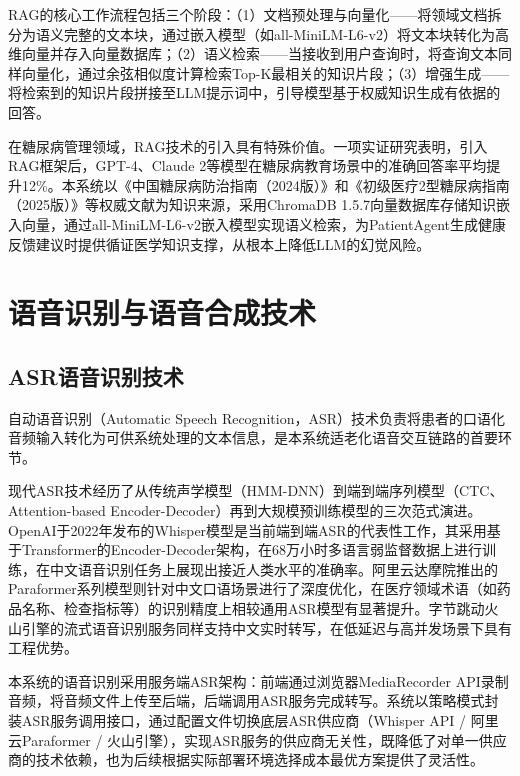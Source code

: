RAG的核心工作流程包括三个阶段：（1）文档预处理与向量化——将领域文档拆分为语义完整的文本块，通过嵌入模型（如all-MiniLM-L6-v2）将文本块转化为高维向量并存入向量数据库；（2）语义检索——当接收到用户查询时，将查询文本同样向量化，通过余弦相似度计算检索Top-K最相关的知识片段；（3）增强生成——将检索到的知识片段拼接至LLM提示词中，引导模型基于权威知识生成有依据的回答\todocite{}。

在糖尿病管理领域，RAG技术的引入具有特殊价值。一项实证研究表明，引入RAG框架后，GPT-4、Claude 2等模型在糖尿病教育场景中的准确回答率平均提升12\%\todocite{}。本系统以《中国糖尿病防治指南（2024版）》和《初级医疗2型糖尿病指南（2025版）》等权威文献为知识来源，采用ChromaDB 1.5.7向量数据库存储知识嵌入向量，通过all-MiniLM-L6-v2嵌入模型实现语义检索，为PatientAgent生成健康反馈建议时提供循证医学知识支撑，从根本上降低LLM的幻觉风险。

\section{语音识别与语音合成技术}

\subsection{ASR语音识别技术}

自动语音识别（Automatic Speech Recognition，ASR）技术负责将患者的口语化音频输入转化为可供系统处理的文本信息，是本系统适老化语音交互链路的首要环节。

现代ASR技术经历了从传统声学模型（HMM-DNN）到端到端序列模型（CTC、Attention-based Encoder-Decoder）再到大规模预训练模型的三次范式演进。OpenAI于2022年发布的Whisper模型是当前端到端ASR的代表性工作，其采用基于Transformer的Encoder-Decoder架构，在68万小时多语言弱监督数据上进行训练，在中文语音识别任务上展现出接近人类水平的准确率\todocite{}。阿里云达摩院推出的Paraformer系列模型则针对中文口语场景进行了深度优化，在医疗领域术语（如药品名称、检查指标等）的识别精度上相较通用ASR模型有显著提升\todocite{}。字节跳动火山引擎的流式语音识别服务同样支持中文实时转写，在低延迟与高并发场景下具有工程优势\todocite{}。

本系统的语音识别采用服务端ASR架构：前端通过浏览器MediaRecorder API录制音频，将音频文件上传至后端，后端调用ASR服务完成转写。系统以策略模式封装ASR服务调用接口，通过配置文件切换底层ASR供应商（Whisper API / 阿里云Paraformer / 火山引擎），实现ASR服务的供应商无关性，既降低了对单一供应商的技术依赖，也为后续根据实际部署环境选择成本最优方案提供了灵活性。

